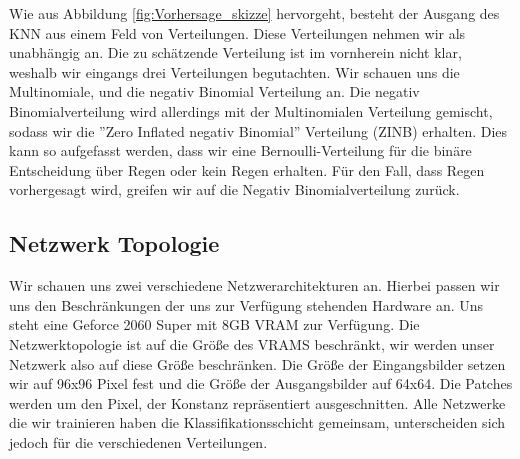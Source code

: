 \noindent Wie aus Abbildung \ref{fig:Vorhersage_skizze} hervorgeht, besteht der Ausgang des KNN aus einem Feld von Verteilungen. Diese Verteilungen nehmen wir als unabhängig an.
Die zu schätzende Verteilung ist im vornherein nicht klar, weshalb wir eingangs drei Verteilungen begutachten.
Wir schauen uns die Multinomiale, und die negativ Binomial Verteilung an.
Die negativ Binomialverteilung wird allerdings mit der Multinomialen Verteilung gemischt, sodass wir die ''Zero Inflated negativ Binomial'' Verteilung (ZINB) erhalten.
Dies kann so aufgefasst werden, dass wir eine Bernoulli-Verteilung für die binäre Entscheidung über Regen oder kein Regen erhalten. Für den Fall, dass Regen vorhergesagt wird, greifen wir auf die Negativ Binomialverteilung zurück.
\\

\subsection{Netzwerk Topologie}

\noindent Wir schauen uns zwei verschiedene Netzwerarchitekturen an. Hierbei passen wir uns den Beschränkungen der uns zur Verfügung stehenden Hardware an.
Uns steht eine Geforce 2060 Super mit 8GB VRAM zur Verfügung. Die Netzwerktopologie ist auf die Größe des VRAMS beschränkt, wir werden unser Netzwerk also auf diese Größe beschränken. Die Größe der Eingangsbilder setzen wir auf 96x96 Pixel fest und die Größe der Ausgangsbilder auf 64x64. Die Patches werden um den Pixel, der Konstanz repräsentiert ausgeschnitten.
Alle Netzwerke die wir trainieren haben die Klassifikationsschicht gemeinsam, unterscheiden sich jedoch für die verschiedenen Verteilungen.\\

